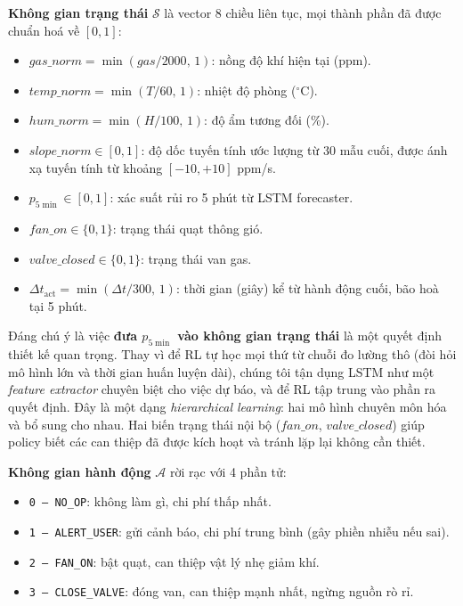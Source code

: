 \textbf{Không gian trạng thái} $\mathcal{S}$ là vector 8 chiều liên tục, mọi thành phần đã được chuẩn hoá về $[0, 1]$:
\begin{itemize}
  \item $gas\_norm = \min(gas / 2000,\,1)$: nồng độ khí hiện tại (ppm).
  \item $temp\_norm = \min(T / 60,\,1)$: nhiệt độ phòng ($^\circ$C).
  \item $hum\_norm = \min(H / 100,\,1)$: độ ẩm tương đối (\%).
  \item $slope\_norm \in [0, 1]$: độ dốc tuyến tính ước lượng từ 30 mẫu cuối, được ánh xạ tuyến tính từ khoảng $[-10, +10]$ ppm/s.
  \item $p_{5\min} \in [0, 1]$: xác suất rủi ro 5 phút từ LSTM forecaster.
  \item $fan\_on \in \{0, 1\}$: trạng thái quạt thông gió.
  \item $valve\_closed \in \{0, 1\}$: trạng thái van gas.
  \item $\Delta t_{\text{act}} = \min(\Delta t / 300,\,1)$: thời gian (giây) kể từ hành động cuối, bão hoà tại 5 phút.
\end{itemize}

Đáng chú ý là việc \textbf{đưa $p_{5\min}$ vào không gian trạng thái} là một quyết định thiết kế quan trọng. Thay vì để RL tự học mọi thứ từ chuỗi đo lường thô (đòi hỏi mô hình lớn và thời gian huấn luyện dài), chúng tôi tận dụng LSTM như một \textit{feature extractor} chuyên biệt cho việc dự báo, và để RL tập trung vào phần ra quyết định. Đây là một dạng \textit{hierarchical learning}: hai mô hình chuyên môn hóa và bổ sung cho nhau. Hai biến trạng thái nội bộ ($fan\_on$, $valve\_closed$) giúp policy biết các can thiệp đã được kích hoạt và tránh lặp lại không cần thiết.

\textbf{Không gian hành động} $\mathcal{A}$ rời rạc với 4 phần tử:
\begin{itemize}
  \item \texttt{0 -- NO\_OP}: không làm gì, chi phí thấp nhất.
  \item \texttt{1 -- ALERT\_USER}: gửi cảnh báo, chi phí trung bình (gây phiền nhiễu nếu sai).
  \item \texttt{2 -- FAN\_ON}: bật quạt, can thiệp vật lý nhẹ giảm khí.
  \item \texttt{3 -- CLOSE\_VALVE}: đóng van, can thiệp mạnh nhất, ngừng nguồn rò rỉ.
\end{itemize}

